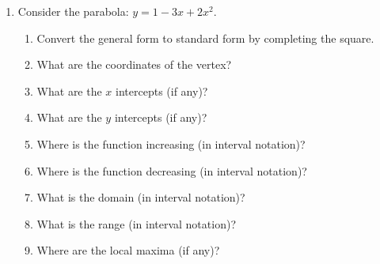 \documentclass[letterpaper,12pt,fleqn]{article}
\begin{document}
\begin{enumerate}
\begin{enumerate}
    \begin{figure}[h]
      \setlength{\leftskip}{1in}
    \end{figure}
  \end{enumerate}

  \newpage

\item Consider the parabola: $y=1-3x+2x^2$.
  \begin{enumerate}
  \item Convert the general form to standard form by completing the square.

    \vspace{3in}
    
  \item What are the coordinates of the vertex?

    \vspace{1in}

  \item What are the $x$ intercepts (if any)?

    \vspace{2in}
    
  \item What are the $y$ intercepts (if any)?

    \newpage
    
  \item Where is the function increasing (in interval notation)?

    \vspace{0.5in}
    
  \item Where is the function decreasing (in interval notation)?

    \vspace{0.5in}
    
  \item What is the domain (in interval notation)?

    \vspace{0.5in}

  \item What is the range (in interval notation)?

    \vspace{0.5in}
    
  \item Where are the local maxima (if any)?


\end{enumerate}
\end{enumerate}
\end{document}
